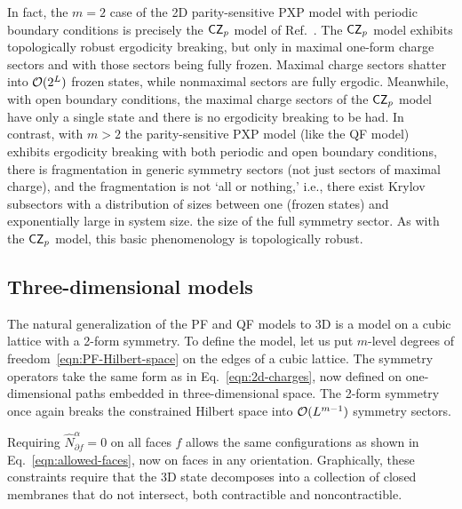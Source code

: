 In fact, the $m=2$ case of the 2D parity-sensitive PXP model with periodic boundary conditions is precisely the $\CZp$ model of Ref.~\cite{Stephen2022Robust}. The $\CZp$ model exhibits topologically robust ergodicity breaking, but only in maximal one-form charge sectors and with those sectors being fully frozen. Maximal charge sectors shatter into $\cal{O}(2^L)$ frozen states, while nonmaximal sectors are fully ergodic. Meanwhile, with open boundary conditions, the maximal charge sectors of the $\CZp$ model have only a single state and there is no ergodicity breaking to be had. In contrast, with $m>2$ the parity-sensitive PXP model (like the QF model) exhibits ergodicity breaking with both periodic and open boundary conditions, there is fragmentation in generic symmetry sectors (not just sectors of maximal charge), and the fragmentation is not `all or nothing,' i.e., there exist Krylov subsectors with a distribution of sizes between one (frozen states) and exponentially large in system size.
the size of the full symmetry sector. 
As with the $\CZp$ model, this basic phenomenology is topologically robust. 


\subsection{Three-dimensional models}
\label{sec:3D}

The natural generalization of the PF and QF models to 3D is a model on a cubic lattice with a 2-form symmetry. To define the model, let us put $m$-level degrees of freedom~\eqref{eqn:PF-Hilbert-space} on the edges of a cubic lattice.
The symmetry operators take the same form as in Eq.~\eqref{eqn:2d-charges}, now defined on one-dimensional paths embedded in three-dimensional space. The 2-form symmetry once again breaks the constrained Hilbert space into $\cal{O}(L^{m-1})$ symmetry sectors.

Requiring $\hat{N}^\alpha_{\partial f} = 0$ on all faces $f$ allows the same configurations as shown in Eq.~\eqref{eqn:allowed-faces}, now on faces in any orientation. Graphically, these constraints require that the 3D state decomposes into a collection of closed membranes that do not intersect, both contractible and noncontractible.

